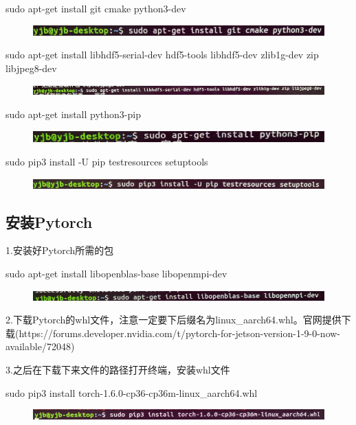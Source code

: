 \documentclass[openbib]{article}
\begin{document}
sudo apt-get install git cmake python3-dev
\begin{figure}[H]
	\centering
	\includegraphics[scale=0.3]{d1}
\end{figure}

sudo apt-get install libhdf5-serial-dev hdf5-tools libhdf5-dev zlib1g-dev zip libjpeg8-dev

\begin{figure}[H]
	\centering
	\includegraphics[scale=0.3]{d2}
\end{figure}

sudo apt-get install python3-pip

\begin{figure}[H]
	\centering
	\includegraphics[scale=0.3]{d3}
\end{figure}
sudo pip3 install -U pip testresources setuptools
\begin{figure}[H]
	\centering
	\includegraphics[scale=0.3]{d4}
\end{figure}
\subsection{安装Pytorch}
1.安装好Pytorch所需的包

sudo apt-get install libopenblas-base libopenmpi-dev
\begin{figure}[H]
	\centering
	\includegraphics[scale=0.3]{d5}
\end{figure}

2.下载Pytorch的whl文件，注意一定要下后缀名为linux\_aarch64.whl。官网提供下载(https://forums.developer.nvidia.com/t/pytorch-for-jetson-version-1-9-0-now-available/72048)

3.之后在下载下来文件的路径打开终端，安装whl文件

sudo pip3 install torch-1.6.0-cp36-cp36m-linux\_aarch64.whl 
\begin{figure}[H]
	\centering
	\includegraphics[scale=0.3]{d6}
\end{figure}
\end{document}
